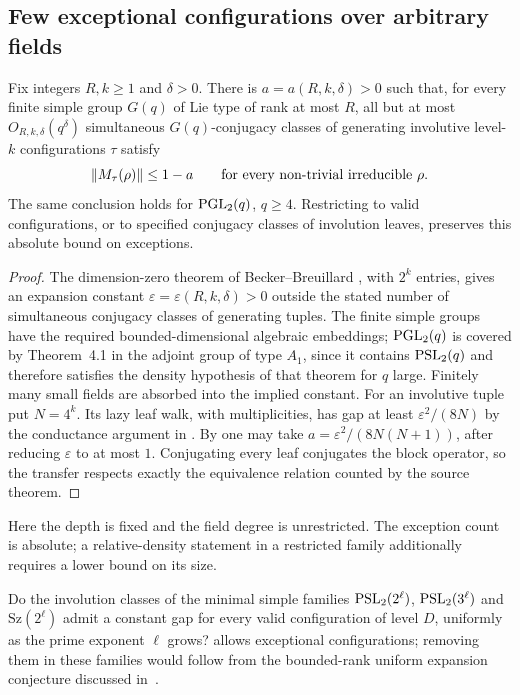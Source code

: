 \subsection{Few exceptional configurations over arbitrary fields}

\begin{corollary}
\label{cor:few-exceptional-blocks}
Fix integers $R,k\ge1$ and $\delta>0$.
There is $a=a(R,k,\delta)>0$ such that, for every finite simple group
$G(q)$ of Lie type of rank at most $R$, all but at most
$O_{R,k,\delta}(q^\delta)$ simultaneous $G(q)$-conjugacy classes of
generating involutive level-$k$ configurations $\tau$ satisfy
\[
 \lVert M_\tau(\rho) \rVert\le1-a
 \qquad\text{for every non-trivial irreducible }\rho.
\]
The same conclusion holds for $\operatorname{PGL}_2(q)$, $q\ge4$.
Restricting to valid configurations, or to specified conjugacy classes
of involution leaves, preserves this absolute bound on exceptions.
\end{corollary}
\begin{proof}
The dimension-zero theorem of Becker--Breuillard
\cite[Theorems 1.2 and 4.1]{BeckerBreuillard2026}, with $2^k$ entries,
gives an expansion constant $\varepsilon=\varepsilon(R,k,\delta)>0$
outside the stated number of simultaneous conjugacy classes of
generating tuples. The finite simple groups have the required
bounded-dimensional algebraic embeddings; $\operatorname{PGL}_2(q)$ is covered
by Theorem~4.1 in the adjoint group of type $A_1$, since it contains
$\operatorname{PSL}_2(q)$ and therefore satisfies the density hypothesis of that
theorem for $q$ large.
Finitely many small fields are absorbed into the implied constant.
For an involutive tuple put $N=4^k$. Its lazy leaf walk, with
multiplicities, has gap at least $\varepsilon^2/(8N)$ by the
conductance argument in . By
 one may take
$a=\varepsilon^2/(8N(N+1))$, after reducing $\varepsilon$ to at most $1$.
Conjugating every leaf conjugates the block operator, so the transfer
respects exactly the equivalence relation counted by the source theorem.
\end{proof}

Here the depth is fixed and the field degree is unrestricted. The
exception count is absolute; a relative-density statement in a
restricted family additionally requires a lower bound on its size.

\begin{remark}[A question]
\label{rem:rates-question}
Do the involution classes of the minimal simple families
$\operatorname{PSL}_2(2^\ell)$, $\operatorname{PSL}_2(3^\ell)$ and $\mathrm{Sz}(2^\ell)$ admit a
constant gap for every valid configuration of level $D$, uniformly as
the prime exponent $\ell$ grows? 
allows exceptional configurations; removing them in these families
would follow from the bounded-rank uniform expansion conjecture
discussed in~\cite[Introduction]{BeckerBreuillard2026}.
\end{remark}
